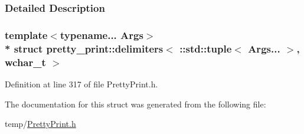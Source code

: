 \subsubsection{Detailed Description}
\subsubsection*{template$<$typename... Args$>$\\*
struct pretty\+\_\+print\+::delimiters$<$ \+::std\+::tuple$<$ Args... $>$, wchar\+\_\+t $>$}



Definition at line 317 of file Pretty\+Print.\+h.



The documentation for this struct was generated from the following file\+:\begin{DoxyCompactItemize}
\item 
temp/\hyperlink{PrettyPrint_8h}{Pretty\+Print.\+h}\end{DoxyCompactItemize}
